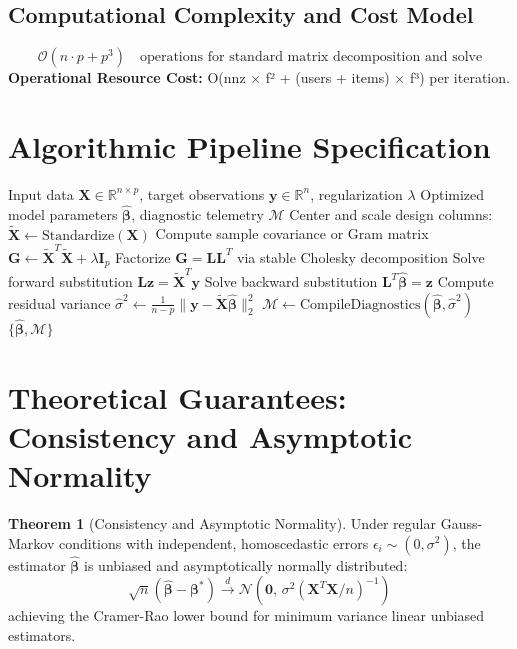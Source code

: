 \documentclass[11pt,a4paper]{article}
\theoremstyle{definition}
\newtheorem{theorem}{\textbf{Theorem}}[section]
\begin{document}
\subsection{Computational Complexity and Cost Model}
\begin{equation}
\mathcal{O}(n \cdot p + p^3) \quad \text{operations for standard matrix decomposition and solve}
\end{equation}
\textbf{Operational Resource Cost:} O(nnz × f² + (users + items) × f³) per iteration.

\section{Algorithmic Pipeline Specification}

\begin{algorithm}[H]
\caption{Alternating least squares for matrix factorization Execution}
\begin{algorithmic}[1]
\Require Input data $\mathbf{X} \in \mathbb{R}^{n \times p}$, target observations $\mathbf{y} \in \mathbb{R}^n$, regularization $\lambda$
\Ensure Optimized model parameters $\hat{\boldsymbol{\beta}}$, diagnostic telemetry $\mathcal{M}$
\State Center and scale design columns: $\tilde{\mathbf{X}} \gets \text{Standardize}(\mathbf{X})$
\State Compute sample covariance or Gram matrix $\mathbf{G} \gets \tilde{\mathbf{X}}^T \tilde{\mathbf{X}} + \lambda \mathbf{I}_p$
\State Factorize $\mathbf{G} = \mathbf{L} \mathbf{L}^T$ via stable Cholesky decomposition
\State Solve forward substitution $\mathbf{L} \mathbf{z} = \tilde{\mathbf{X}}^T \mathbf{y}$
\State Solve backward substitution $\mathbf{L}^T \hat{\boldsymbol{\beta}} = \mathbf{z}$
\State Compute residual variance $\hat{\sigma}^2 \gets \frac{1}{n - p} \| \mathbf{y} - \tilde{\mathbf{X}} \hat{\boldsymbol{\beta}} \|_2^2$
\State $\mathcal{M} \gets \text{CompileDiagnostics}(\hat{\boldsymbol{\beta}}, \hat{\sigma}^2)$
\State \Return $\{\hat{\boldsymbol{\beta}}, \mathcal{M}\}$
\end{algorithmic}
\end{algorithm}

\section{Theoretical Guarantees: Consistency and Asymptotic Normality}

\begin{theorem}[Consistency and Asymptotic Normality]
Under regular Gauss-Markov conditions with independent, homoscedastic errors $\epsilon_i \sim (0, \sigma^2)$, the estimator $\hat{\boldsymbol{\beta}}$ is unbiased and asymptotically normally distributed:
\begin{equation}
\sqrt{n}(\hat{\boldsymbol{\beta}} - \boldsymbol{\beta}^*) \xrightarrow{d} \mathcal{N}\left(\mathbf{0}, \, \sigma^2 (\mathbf{X}^T \mathbf{X} / n)^{-1}\right)
\end{equation}
achieving the Cramer-Rao lower bound for minimum variance linear unbiased estimators.
\end{theorem}
\end{document}
